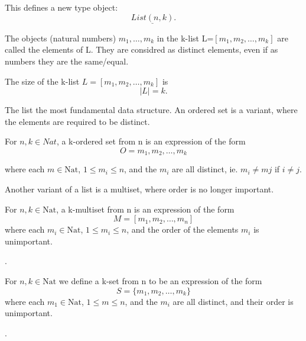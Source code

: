 \vspace{1em}
This defines a new type object: \[
    \underline{List(n,k)}
.\]

\vspace{1em}

\vspace{1em}
The objects (natural numbers) \( m_{1},\dots,m_{k} \) in the k-list L=\( [m_{1},m_{2},\dots,m_{k}] \) are called
the elements of L. They are considred as distinct elements, even if as numbers they are the same/equal.

\vspace{1em}
The size of the k-list \( L = [m_{1},m_{2},\dots,m_{k}] \) is
\[
    \lvert L \rvert = k
.\]

The list the most fundamental data structure. An ordered set is a variant, where the elements
are required to be distinct.

\begin{definition}
    For \( n,k \in Nat \), a k-ordered set from n is an expression of the form
    \begin{displaymath}
        O = {m_{1},m_{2},\dots, m_{k}}
    \end{displaymath}

    where each \( m \in  \text{Nat} \), \( 1\le m_{i}\le n  \), and the \( m_{i} \) are
    all distinct, ie. \( m_{i} \neq m{j} \) if \( i \neq j \).

\end{definition}


Another variant of a list is a multiset, where order is no longer important.

\begin{definition}[k-multiset]
    For \( n,k \in \text{Nat} \), a k-multiset from n is an expression of the form
    \[
        M = [m_{1},m_{2}, \dots, m_{n}]
    \]
    where each \( m_{i} \in \text{Nat} \), \( 1 \le m_{i} \le n \), and the order
    of the elements \( m_{i} \) is unimportant.
\end{definition}

.

\begin{definition}[k-set]
    For \( n,k \in \text{Nat}\) we define a k-set from n to be an expression of the
    form \[
        S = \{m_{1},m_{2},\dots, m_{k}\}
    \]
    where each \( m_{1} \in \text{Nat} \), \( 1 \le m \le n \), and the \( m_{i} \) are
    all distinct, and their order is unimportant.
\end{definition}

.
